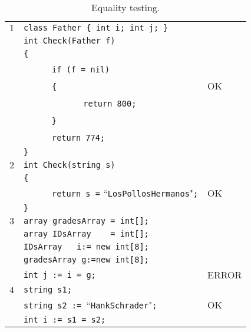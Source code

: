 \documentclass{article}
\begin{document}
\begin{table}[h]
\centering
\begin{tabular}{|l|l|l|}
\hline
 $1$ & \verb"class Father { int i; int j; }" &    \\
     & \verb"int Check(Father f)"            &    \\
     & \verb"{"                              &    \\
     & ~ ~ ~ ~\verb"if (f = nil)"           &    \\
     & ~ ~ ~ ~\verb"{"                       & OK \\
     & ~ ~ ~ ~ ~ ~ ~ ~\verb"return 800;"     &    \\
     & ~ ~ ~ ~\verb"}"                       &    \\
     & ~ ~ ~ ~\verb"return 774;"             &    \\
     & \verb"}"                              &    \\
\hline
 $2$ & \verb"int Check(string s)"                                   &    \\
     & \verb"{"                                                     &    \\
     & ~ ~ ~ ~\verb"return s =" ``\verb"LosPollosHermanos""\verb";" & OK \\
     & \verb"}"                                                     &    \\
\hline
 $3$ & \verb"array gradesArray = int[];"        &       \\
     & \verb"array IDsArray    = int[];"        &       \\
     & \verb"IDsArray   i:= new int[8];"       &       \\
     & \verb"gradesArray g:=new int[8];"       &       \\
     & \verb"int j := i = g;"                  & ERROR \\
\hline
 $4$ & \verb"string s1;"                                  &    \\
     & \verb"string s2 := "``\verb"HankSchrader""\verb";" & OK \\
     & \verb"int i := s1 = s2;"                           &    \\
\hline
\end{tabular}
\caption{Equality testing.
\label{Table_Code_Examples_Equality_Testing}}
\end{table}
\end{document}
